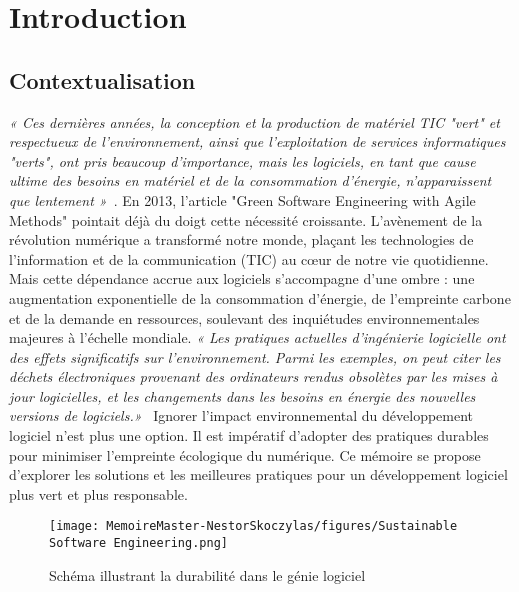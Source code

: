 \chapter{Introduction} 	%
\label{Chapter0} 		%

\section{Contextualisation}
\label{sec:Ch0.1}
\emph{« Ces dernières années, la conception et la production de matériel TIC "vert" et respectueux de l'environnement, ainsi que l'exploitation de services informatiques "verts", ont pris beaucoup d'importance, mais les logiciels, en tant que cause ultime des besoins en matériel et de la consommation d'énergie, n'apparaissent que lentement »}~\cite{GreenAgileMethods}. En 2013, l'article "Green Software Engineering with Agile Methods" pointait déjà du doigt cette nécessité croissante. L'avènement de la révolution numérique a transformé notre monde, plaçant les technologies de l'information et de la communication (TIC) au cœur de notre vie quotidienne. Mais cette dépendance accrue aux logiciels s'accompagne d'une ombre : une augmentation exponentielle de la consommation d'énergie, de l'empreinte carbone et de la demande en ressources, soulevant des inquiétudes environnementales majeures à l'échelle mondiale. \emph{« Les pratiques actuelles d'ingénierie logicielle ont des effets significatifs sur l'environnement. Parmi les exemples, on peut citer les déchets électroniques provenant des ordinateurs rendus obsolètes par les mises à jour logicielles, et les changements dans les besoins en énergie des nouvelles versions de logiciels.»}~\cite{TowardSustainableSoftwareEngineering} Ignorer l'impact environnemental du développement logiciel n'est plus une option. Il est impératif d'adopter des pratiques durables pour minimiser l'empreinte écologique du numérique. Ce mémoire se propose d'explorer les solutions et les meilleures pratiques pour un développement logiciel plus vert et plus responsable.

\begin{figure}[H]
    \centering
    \texttt{[image: MemoireMaster-NestorSkoczylas/figures/Sustainable Software Engineering.png]}
    \caption{Schéma illustrant la durabilité dans le génie logiciel}
    \label{fig:durabilite-geni-logiciel}
\end{figure}

